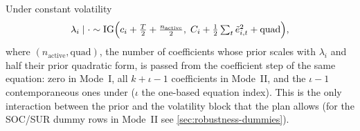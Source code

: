 Under constant volatility
\begin{equation}\label{eq:constant-core}
  \lambda_i \mid \cdot \sim \mathrm{IG}\Bigl(c_i + \tfrac{T}{2} + \tfrac{n_{\mathrm{active}}}{2},\;
  C_i + \tfrac12\textstyle\sum_t \tilde e_{i,t}^2 + \mathrm{quad}\Bigr), %
\end{equation}
where $(n_{\mathrm{active}}, \mathrm{quad})$, the number of coefficients whose prior scales with
$\lambda_i$ and half their prior quadratic form, is passed from the coefficient step of the same
equation: zero in Mode~I, all $k + \iota - 1$ coefficients in Mode~II, and the $\iota - 1$ contemporaneous
ones under  ($\iota$ the one-based equation index).
This is the only interaction between the prior and the volatility block that the plan allows (for
the SOC/SUR dummy rows in Mode~II see \cref{sec:robustness-dummies}). %
